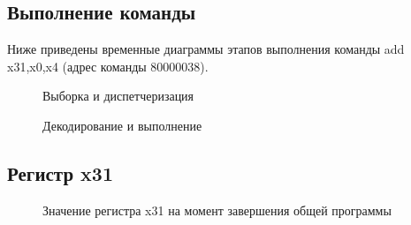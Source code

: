 \subsection{Выполнение команды}

Ниже приведены временные диаграммы этапов выполнения команды
add x31,x0,x4 (адрес команды 80000038). 

\begin{figure}[ph!]
    \caption{Выборка и диспетчеризация}
\end{figure}

\begin{figure}[ph!]
    \caption{Декодирование и выполнение}
\end{figure}

\clearpage

\subsection{Регистр x31}

\begin{figure}[ph!]
    \caption{Значение регистра x31 на момент завершения общей программы}
\end{figure}

